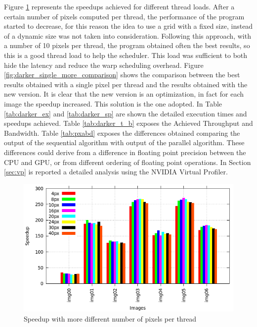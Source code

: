 \documentclass[a4paper]{article}
\begin{document}
Figure \ref{fig:darker_try_histo} represents the speedups achieved for different thread loads. After a certain number of pixels computed per thread, the performance of the program started to decrease, for this reason the idea to use a grid with a fixed size, instead of a dynamic size was not taken into consideration. Following this approach, with a number of 10 pixels per thread, the program obtained often the best results, so this is a good thread load to help the scheduler. This load was sufficient to both hide the latency and reduce the warp scheduling overhead. Figure \ref{fig:darker_single_more_comparison} shows the comparison between the best results obtained with a single pixel per thread and the results obtained with the new version. It is clear that the new version is an optimization, in fact for each image the speedup increased. This solution is the one adopted. In Table \ref{tab:darker_ex} and \ref{tab:darker_sp} are shown the detailed execution times and speedups achieved. Table \ref{tab:darker_t_b} exposes the Achieved Throughput and Bandwidth. Table \ref{tab:pxabd} exposes the differences obtained comparing the output of the sequential algorithm with output of the parallel algorithm. These differences could derive from a difference in floating point precision between the CPU and GPU, or from different ordering of floating point operations. In Section \ref{sec:vp} is reported a detailed analysis using the NVIDIA Virtual Profiler.
    
\begin{figure}[!ht]
    \centering
    \includegraphics[width=0.9\linewidth]{res/new/darker_try_histo}
    \caption{Speedup with more different number of pixels per thread}
    \label{fig:darker_try_histo}
\end{figure}
\FloatBarrier
\end{document}
